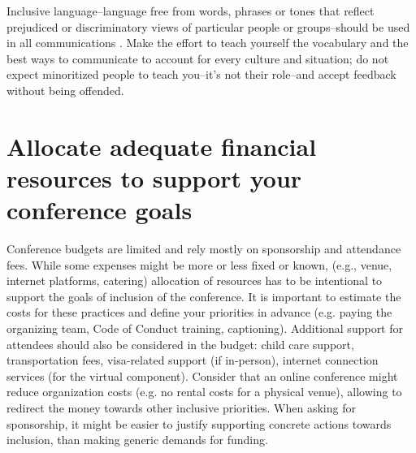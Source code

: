 \documentclass[10pt,letterpaper]{article}
\begin{document}
Inclusive language--language free from words, phrases or tones that reflect prejudiced or discriminatory views of particular people or groups--should be used in all communications \cite{hallDesigningDiversityInclusion2019}.
Make the effort to teach yourself the vocabulary and the best ways to communicate to account for every culture and situation; do not expect minoritized people to teach you--it's not their role--and accept feedback without being offended.




\section{Allocate adequate financial resources to support your conference goals}
\label{rule_financial}

Conference budgets are limited and rely mostly on sponsorship and attendance fees. 
While some expenses might be more or less fixed or known, (e.g., venue, internet platforms, catering) %
allocation of resources has to be intentional to support the goals of inclusion of the conference. 
It is important to estimate the costs for these practices and define your priorities in advance (e.g. paying the organizing team, Code of Conduct training, captioning).
Additional support for attendees should also be considered in the budget: child care support, transportation fees, visa-related support (if in-person), internet connection services (for the virtual component). 
Consider that an online conference might reduce organization costs (e.g. no rental costs for a physical venue), allowing to redirect the money towards other inclusive priorities. 
When asking for sponsorship, it might be easier to justify supporting concrete actions towards inclusion, than making generic demands for funding.
\end{document}
